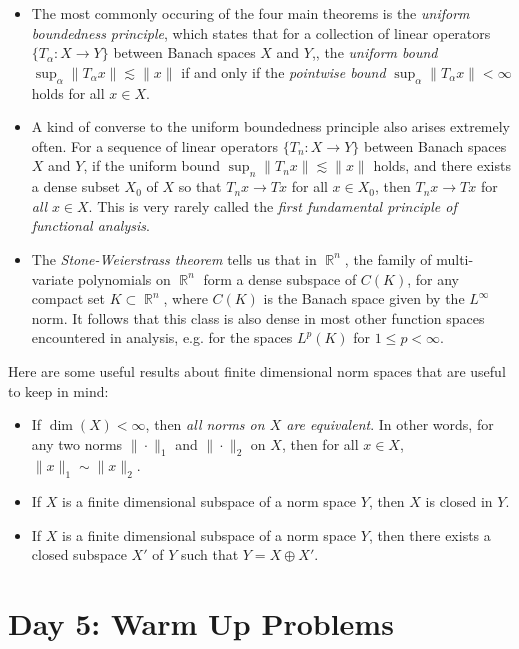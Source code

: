 \documentclass[answers]{exam}
\DeclareMathOperator{\RR}{\mathbb{R}}
\begin{document}
\begin{questions}
\begin{itemize}
	\item The most commonly occuring of the four main theorems is the \emph{uniform boundedness principle}, which states that for a collection of linear operators $\{ T_\alpha: X \to Y \}$ between Banach spaces $X$ and $Y$,, the \emph{uniform bound} $\sup_\alpha \| T_\alpha x \| \lesssim \| x \|$ if and only if the \emph{pointwise bound} $\sup_\alpha \| T_\alpha x \| < \infty$ holds for all $x \in X$.

	\item A kind of converse to the uniform boundedness principle also arises extremely often. For a sequence of linear operators $\{ T_n: X \to Y \}$ between Banach spaces $X$ and $Y$, if the uniform bound $\sup_n \| T_n x \| \lesssim \| x \|$ holds, and there exists a dense subset $X_0$ of $X$ so that $T_n x \to Tx$ for all $x \in X_0$, then $T_n x \to Tx$ for \emph{all} $x \in X$. This is very rarely called the \emph{first fundamental principle of functional analysis}.

	\item The \emph{Stone-Weierstrass theorem} tells us that in $\RR^n$, the family of multi-variate polynomials on $\RR^n$ form a dense subspace of $C(K)$, for any compact set $K \subset \RR^n$, where $C(K)$ is the Banach space given by the $L^\infty$ norm. It follows that this class is also dense in most other function spaces encountered in analysis, e.g. for the spaces $L^p(K)$ for $1 \leq p < \infty$.
\end{itemize}

Here are some useful results about finite dimensional norm spaces that are useful to keep in mind:
%
\begin{itemize}
	\item If $\dim(X) < \infty$, then \emph{all norms on $X$ are equivalent}. In other words, for any two norms $\| \cdot \|_1$ and $\| \cdot \|_2$ on $X$, then for all $x \in X$, $\| x \|_1 \sim \| x \|_2$.

	\item If $X$ is a finite dimensional subspace of a norm space $Y$, then $X$ is closed in $Y$.

	\item If $X$ is a finite dimensional subspace of a norm space $Y$, then there exists a closed subspace $X'$ of $Y$ such that $Y = X \oplus X'$.
\end{itemize}




\newpage
\section{Day 5: Warm Up Problems}


\end{questions}
\end{document}

